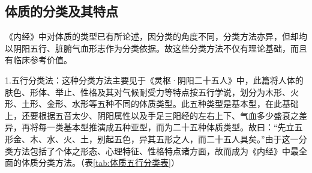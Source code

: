 \documentclass[draft,12pt]{ctexbook}
\begin{document}
\subsection{体质的分类及其特点}%

《内经》中对体质的类型已有所论述，因分类的角度不同，分类方法亦异，但却均以阴阳五行、脏腑气血形志作为分类依据。故这些分类方法不仅有理论基础，而且有临床参考价值。

1.五行分类法：这种分类方法主要见于《灵枢·阴阳二十五人》中，此篇将人体的肤色、形体、举止、性格及其对气候耐受力等特点按五行学说，划分为木形、火形、土形、金形、水形等五种不同的体质类型。此五种类型是基本型，在此基础上，还要根据五音太少、阴阳属性以及手足三阳经的左右上下、气血多少盛衰之差异，再将每一类基本型推演成五种亚型，而为二十五种体质类型。故曰：“先立五形金、木、水、火、土，别起五色，异其五形之人，而二十五人具矣。”由于这一分类方法包括了个体之形态、心理特征、性格特点诸方面，故而成为《内经》中最全面的体质分类方法。（表\ref{tab:体质五行分类表}）
\end{document}
